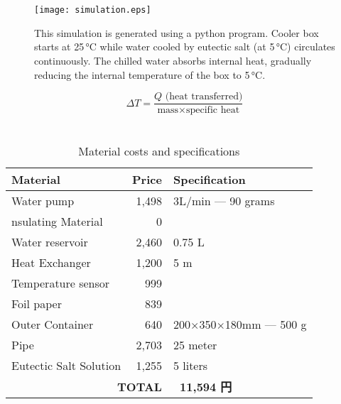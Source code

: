 \documentclass[twocolumn]{article}
\newcommand{\SectionFont}{\fontsize{60pt}{70pt}\selectfont}
\newcommand{\BodyFont}{\fontsize{39pt}{42pt}\selectfont}
\begin{document}
\section*{\SectionFont{Simulation}}
\begin{figure}[H]
    \centering
    \texttt{[image: simulation.eps]}
    \caption{This simulation is generated using a python program. Cooler box starts at 25\,°C while water cooled by eutectic salt (at 5\,°C) circulates continuously. The chilled water absorbs internal heat, gradually reducing the internal temperature of the box to 5\,°C.}
\end{figure}
\begin{equation}
    \Delta T = \frac{Q \text{ (heat transferred)}}{\text{mass} \times \text{specific heat}}
\end{equation}
\section*{\SectionFont{Cost Analysis}}
\begin{table}[ht]
\centering
{\BodyFont
\begin{tabularx}{\linewidth}{|l|r|X|}
\hline
\textbf{Material}           & \textbf{Price} & \textbf{Specification}            \\ \hline
Water pump                 & 1,498              & 3L/min --- 90 grams                 \\ \hline nsulating Material         & 0                  &                                  \\ \hline
Water reservoir            & 2,460              & 0.75 L                          \\ \hline
Heat Exchanger & 1,200          & 5 m                             \\ \hline
Temperature sensor          & 999                &                                  \\ \hline
Foil paper                 & 839                &                                  \\ \hline
Outer Container            & 640                & 200$\times$350$\times$180mm --- 500 g       \\ \hline
Pipe                       & 2,703              & 25 meter                        \\ \hline
Eutectic Salt Solution      & 1,255              & 5 liters                        \\ \hline
\multicolumn{2}{|r|}{\textbf{TOTAL}}           & \textbf{~11,594 円}               \\ \hline
\end{tabularx}
}
\caption{Material costs and specifications}\label{tab:material_costs}
\end{table}
\end{document}
